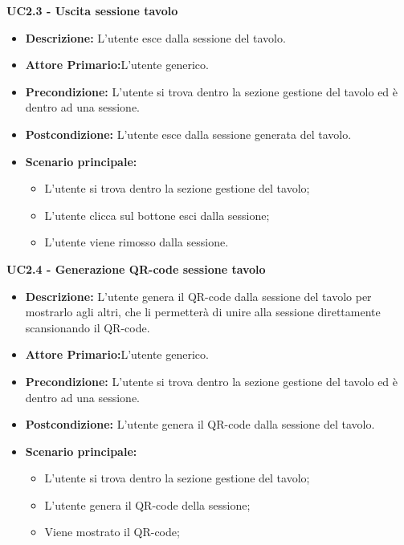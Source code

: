 \textbf{UC2.3 - Uscita sessione tavolo}
\begin{itemize}
    \item \textbf{Descrizione:} L'utente esce dalla sessione del tavolo.
    \item \textbf{Attore Primario:}L'utente generico.
    \item \textbf{Precondizione:} L'utente si trova dentro la sezione gestione del tavolo ed è dentro ad una sessione.
    \item \textbf{Postcondizione:} L'utente esce dalla sessione generata del tavolo.
    \item \textbf{Scenario principale:}
    \begin{itemize}
        \item L'utente si trova dentro la sezione gestione del tavolo;
        \item L'utente clicca sul bottone esci dalla sessione;
        \item L'utente viene rimosso dalla sessione.
    \end{itemize}
\end{itemize}
\textbf{UC2.4 - Generazione QR-code sessione tavolo}
\begin{itemize}
    \item \textbf{Descrizione:} L'utente genera il QR-code dalla sessione del tavolo per mostrarlo agli altri, che li permetterà di unire alla sessione direttamente scansionando il QR-code.
    \item \textbf{Attore Primario:}L'utente generico.
    \item \textbf{Precondizione:} L'utente si trova dentro la sezione gestione del tavolo ed è dentro ad una sessione.
    \item \textbf{Postcondizione:} L'utente genera il QR-code dalla sessione del tavolo.
    \item \textbf{Scenario principale:}
    \begin{itemize}
        \item L'utente si trova dentro la sezione gestione del tavolo;
        \item L'utente genera il QR-code della sessione;
        \item Viene mostrato il QR-code;
    \end{itemize}
\end{itemize}



